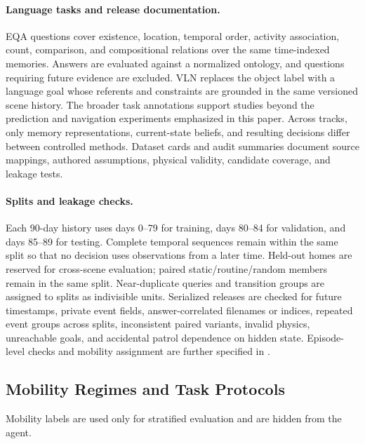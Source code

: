 \paragraph{Language tasks and release documentation.}
EQA questions cover existence, location, temporal order, activity association,
count, comparison, and compositional relations over the same time-indexed
memories.
Answers are evaluated against a normalized ontology, and questions requiring
future evidence are excluded. VLN replaces the object label with a language goal
whose referents and constraints are grounded in the same versioned scene history.
The broader task annotations support studies beyond the prediction and navigation
experiments emphasized in this paper. Across tracks, only memory representations,
current-state beliefs, and resulting decisions differ between controlled methods.
Dataset cards and audit summaries document source mappings, authored assumptions,
physical validity, candidate coverage, and leakage tests.

\paragraph{Splits and leakage checks.}
Each 90-day history uses days 0--79 for training, days 80--84 for validation,
and days 85--89 for testing. Complete temporal sequences remain within the same split so
that no decision uses observations from a later time. Held-out homes are reserved for
cross-scene evaluation; paired static/routine/random members remain in the same
split. Near-duplicate queries and transition groups are assigned to splits as indivisible units.
Serialized releases are checked for future timestamps, private event fields,
answer-correlated filenames or indices, repeated event groups across splits,
inconsistent paired variants, invalid physics, unreachable goals, and accidental
patrol dependence on hidden state. Episode-level checks and mobility assignment
are further specified in .

\subsection{Mobility Regimes and Task Protocols}

Mobility labels are used only for stratified evaluation and are hidden from the
agent.

